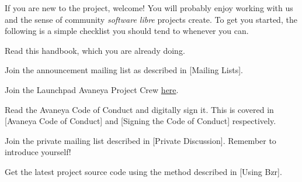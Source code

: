 

If you are new to the project, welcome! You will probably enjoy working with us and the sense of community {\it software libre} projects create. To get you started, the following is a simple checklist you should tend to whenever you can.

\usesymbols[mvs]
\startitemize[1]
\item
Read this handbook, which you are already doing.

\item
Join the announcement mailing list as described in [Mailing Lists].

\item
Join the Launchpad Avaneya Project Crew \href{https://launchpad.net/~avaneya/+join}{here}.

\item
Read the Avaneya Code of Conduct and digitally sign it. This is covered in [Avaneya Code of Conduct] and [Signing the Code of Conduct] respectively.

\item
Join the private mailing list described in [Private Discussion]. Remember to introduce yourself!

\item
Get the latest project source code using the method described in [Using Bzr].
\stopitemize

